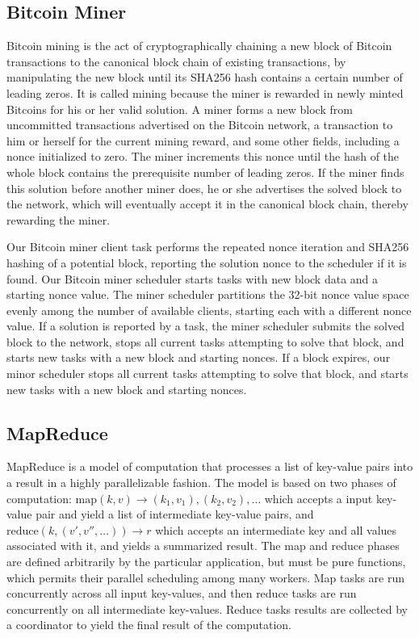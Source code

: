 \documentclass [11pt, twocolumn] {article}
\begin{document}
\subsection {Bitcoin Miner}

Bitcoin mining is the act of cryptographically chaining a new block of Bitcoin transactions to the canonical block chain of existing transactions, by manipulating the new block until its SHA256 hash contains a certain number of leading zeros. It is called mining because the miner is rewarded in newly minted Bitcoins for his or her valid solution. A miner forms a new block from uncommitted transactions advertised on the Bitcoin network, a transaction to him or herself for the current mining reward, and some other fields, including a nonce initialized to zero. The miner increments this nonce until the hash of the whole block contains the prerequisite number of leading zeros. If the miner finds this solution before another miner does, he or she advertises the solved block to the network, which will eventually accept it in the canonical block chain, thereby rewarding the miner.

Our Bitcoin miner client task performs the repeated nonce iteration and SHA256 hashing of a potential block, reporting the solution nonce to the scheduler if it is found. Our Bitcoin miner scheduler starts tasks with new block data and a starting nonce value. The miner scheduler partitions the 32-bit nonce value space evenly among the number of available clients, starting each with a different nonce value. If a solution is reported by a task, the miner scheduler submits the solved block to the network, stops all current tasks attempting to solve that block, and starts new tasks with a new block and starting nonces. If a block expires, our minor scheduler stops all current tasks attempting to solve that block, and starts new tasks with a new block and starting nonces.

\subsection {MapReduce} 

MapReduce is a model of computation that processes a list of key-value pairs into a result in a highly parallelizable fashion. The model is based on two phases of computation: $\text{map}(k, v) \rightarrow ({k_1},{v_1}), ({k_2}, {v_2}), \ldots $ which accepts a input key-value pair and yield a list of intermediate key-value pairs, and $\text{reduce}(k, (v', v'', \ldots) ) \rightarrow r$ which accepts an intermediate key and all values associated with it, and yields a summarized result. The map and reduce phases are defined arbitrarily by the particular application, but must be pure functions, which permits their parallel scheduling among many workers. Map tasks are run concurrently across all input key-values, and then reduce tasks are run concurrently on all intermediate key-values. Reduce tasks results are collected by a coordinator to yield the final result of the computation.
\end{document}
